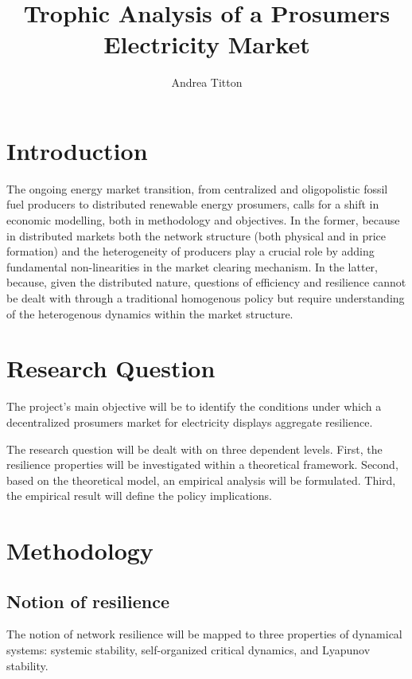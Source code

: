 \documentclass[american]{scrartcl}
\title{
        Trophic Analysis of a Prosumers Electricity Market
    }
\author{Andrea Titton}
\begin{document}
\nocite{*}
\maketitle

\section{Introduction}

The ongoing energy market transition, from centralized and oligopolistic fossil fuel producers to distributed renewable energy prosumers, calls for a shift in economic modelling, both in methodology and objectives. In the former, because in distributed markets both the network structure (both physical and in price formation) and the heterogeneity of producers play a crucial role by adding fundamental non-linearities in the market clearing mechanism. In the latter, because, given the distributed nature, questions of efficiency and resilience cannot be dealt with through a traditional homogenous policy but require understanding of the heterogenous dynamics within the market structure.

\section{Research Question}

The project's main objective will be to identify the conditions under which a decentralized prosumers market for electricity displays aggregate resilience.

The research question will be dealt with on three dependent levels. First, the resilience properties will be investigated within a theoretical framework. Second, based on the theoretical model, an empirical analysis will be formulated. Third, the empirical result will define the policy implications.

\section{Methodology}

\subsection{Notion of resilience}

The notion of network resilience will be mapped to three properties of dynamical systems: systemic stability, self-organized critical dynamics, and Lyapunov stability.
\end{document}
